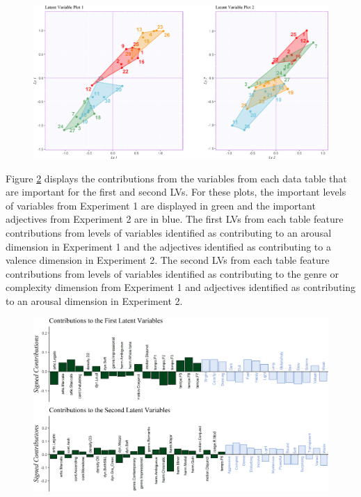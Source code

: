 \documentclass[
  english,
  man]{apa6}
\begin{document}
\begin{figure}   
  \centering  
  \caption{PLSC: Latent variables for Experiment 1 contingency table (horizontal, $x$) plotted against latent variables for Experiment 2 contingency table (vertical, $y$), including tolerance intervals, colored according to the groups revealed by Experiment 2.}
  \label{fig:factorplotsPLSC}
    \includegraphics{./Music-Descriptor-Space_files/figure-latex/factorplotsPLSCcode-1.png}
  \caption*{}
\end{figure}

Figure \ref{fig:contsplsc} displays the contributions from the variables from each data table that are important for the first and second LVs. For these plots, the important levels of variables from Experiment 1 are displayed in green and the important adjectives from Experiment 2 are in blue. The first LVs from each table feature contributions from levels of variables identified as contributing to an arousal dimension in Experiment 1 and the adjectives identified as contributing to a valence dimension in Experiment 2. The second LVs from each table feature contributions from levels of variables identified as contributing to the genre or complexity dimension from Experiment 1 and adjectives identified as contributing to an arousal dimension in Experiment 2.

\begin{figure}   
  \centering  
  \caption{PLSC: Signed contributions important for the first and second latent variables, colored by survey of origin.}
    \includegraphics{./Music-Descriptor-Space_files/figure-latex/contsplsccode-1.png}
  \label{fig:contsplsc}
  \caption*{}
\end{figure}
\end{document}
